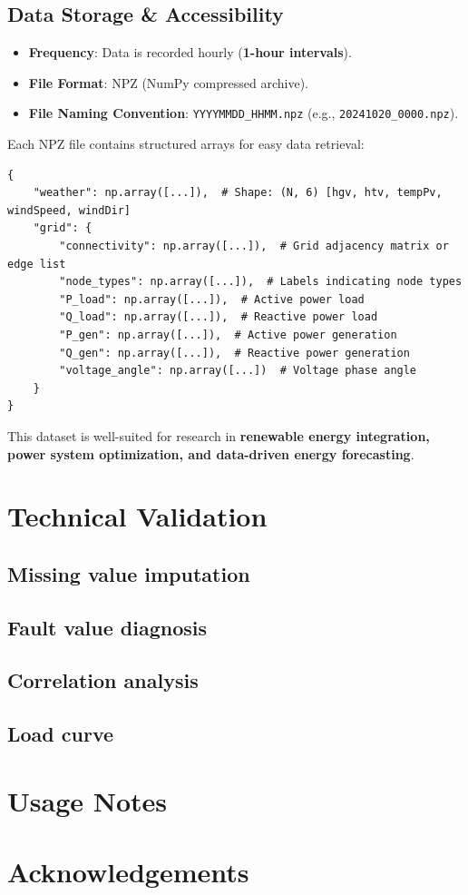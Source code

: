 \documentclass[12pt]{article}
\begin{document}
\subsection*{Data Storage \& Accessibility}
\begin{itemize}
    \item \textbf{Frequency}: Data is recorded hourly (\textbf{1-hour intervals}).
    \item \textbf{File Format}: NPZ (NumPy compressed archive).
    \item \textbf{File Naming Convention}: \texttt{YYYYMMDD\_HHMM.npz} (e.g., \texttt{20241020\_0000.npz}).
\end{itemize}
Each NPZ file contains structured arrays for easy data retrieval:

\begin{verbatim}
{
    "weather": np.array([...]),  # Shape: (N, 6) [hgv, htv, tempPv, windSpeed, windDir]
    "grid": {
        "connectivity": np.array([...]),  # Grid adjacency matrix or edge list
        "node_types": np.array([...]),  # Labels indicating node types
        "P_load": np.array([...]),  # Active power load
        "Q_load": np.array([...]),  # Reactive power load
        "P_gen": np.array([...]),  # Active power generation
        "Q_gen": np.array([...]),  # Reactive power generation
        "voltage_angle": np.array([...])  # Voltage phase angle
    }
}
\end{verbatim}

This dataset is well-suited for research in \textbf{renewable energy integration, power system optimization, and data-driven energy forecasting}.


\section*{Technical Validation}
\subsection*{Missing value imputation}

\subsection*{Fault value diagnosis}

\subsection*{Correlation analysis}
\subsection*{Load curve}

\section*{Usage Notes}

\section*{Acknowledgements}

\end{document}
